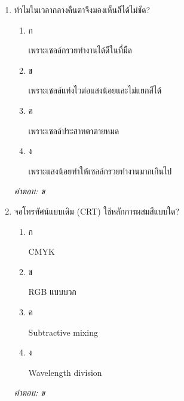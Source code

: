 \documentclass[12pt]{article}
\begin{document}
\begin{enumerate}[label=\arabic*., itemsep=0.5\baselineskip, topsep=0.5\baselineskip, leftmargin=*]
\item ทำไมในเวลากลางคืนตาจึงมองเห็นสีได้ไม่ชัด?
\begin{enumerate}[label=\alph*)., itemsep=0.3\baselineskip, topsep=0.3\baselineskip]
\item ก\ 
\begin{minipage}[t]{0.9\linewidth}
\raggedright เพราะเซลล์กรวยทำงานได้ดีในที่มืด
\end{minipage}
\item ข\ 
\begin{minipage}[t]{0.9\linewidth}
\raggedright เพราะเซลล์แท่งไวต่อแสงน้อยและไม่แยกสีได้
\end{minipage}
\item ค\ 
\begin{minipage}[t]{0.9\linewidth}
\raggedright เพราะเซลล์ประสาทตาตายหมด
\end{minipage}
\item ง\ 
\begin{minipage}[t]{0.9\linewidth}
\raggedright เพราะแสงน้อยทำให้เซลล์กรวยทำงานมากเกินไป
\end{minipage}
\end{enumerate}
\vspace{-0.3\baselineskip}
\begin{small}
\textit{คำตอบ: ข}
\end{small}

\item จอโทรทัศน์แบบเดิม (CRT) ใช้หลักการผสมสีแบบใด?
\begin{enumerate}[label=\alph*)., itemsep=0.3\baselineskip, topsep=0.3\baselineskip]
\item ก\ 
\begin{minipage}[t]{0.9\linewidth}
\raggedright CMYK
\end{minipage}
\item ข\ 
\begin{minipage}[t]{0.9\linewidth}
\raggedright RGB แบบบวก
\end{minipage}
\item ค\ 
\begin{minipage}[t]{0.9\linewidth}
\raggedright Subtractive mixing
\end{minipage}
\item ง\ 
\begin{minipage}[t]{0.9\linewidth}
\raggedright Wavelength division
\end{minipage}
\end{enumerate}
\vspace{-0.3\baselineskip}
\begin{small}
\textit{คำตอบ: ข}
\end{small}


\end{enumerate}
\end{document}
